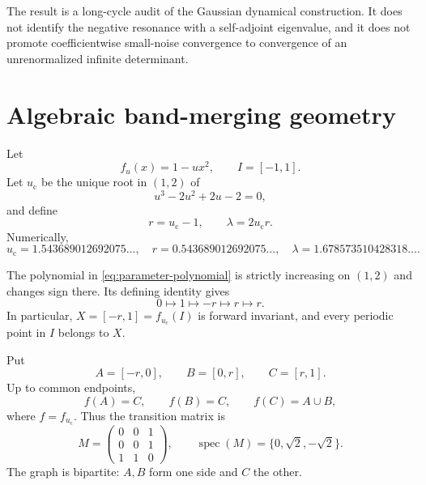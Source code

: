 \documentclass[11pt]{article}
\theoremstyle{definition}
\theoremstyle{remark}
\newcommand{\uc}{u_{\mathrm c}}
\newcommand{\spec}{\operatorname{spec}}
\begin{document}
The result is a long-cycle audit of the Gaussian dynamical construction.  It
does not identify the negative resonance with a self-adjoint eigenvalue, and
it does not promote coefficientwise small-noise convergence to convergence of
an unrenormalized infinite determinant.

\section{Algebraic band-merging geometry}
\label{sec:geometry}

Let
\begin{equation}\label{eq:family}
 f_u(x)=1-u x^2,
 \qquad I=[-1,1].
\end{equation}
Let $\uc$ be the unique root in $(1,2)$ of
\begin{equation}\label{eq:parameter-polynomial}
 u^3-2u^2+2u-2=0,
\end{equation}
and define
\begin{equation}\label{eq:r-lambda}
 r=\uc-1,
 \qquad
 \lambda=2\uc r.
\end{equation}
Numerically,
\begin{equation}\label{eq:constants-numerical}
 \uc=1.543689012692075\ldots,
 \quad r=0.543689012692075\ldots,
 \quad \lambda=1.678573510428318\ldots.
\end{equation}

The polynomial in \eqref{eq:parameter-polynomial} is strictly increasing on
$(1,2)$ and changes sign there.  Its defining identity gives
\begin{equation}\label{eq:critical-orbit}
 0\longmapsto1\longmapsto-r\longmapsto r\longmapsto r.
\end{equation}
In particular, $X=[-r,1]=f_{\uc}(I)$ is forward invariant, and every periodic
point in $I$ belongs to $X$.

Put
\begin{equation}\label{eq:partition}
 A=[-r,0],\qquad B=[0,r],\qquad C=[r,1].
\end{equation}
Up to common endpoints,
\begin{equation}\label{eq:images}
 f(A)=C,\qquad f(B)=C,\qquad f(C)=A\cup B,
\end{equation}
where $f=f_{\uc}$.  Thus the transition matrix is
\begin{equation}\label{eq:markov-matrix}
 M=
 \begin{pmatrix}
 0&0&1\\
 0&0&1\\
 1&1&0
 \end{pmatrix},
 \qquad
 \spec(M)=\{0,\sqrt2,-\sqrt2\}.
\end{equation}
The graph is bipartite: $A,B$ form one side and $C$ the other.
\end{document}
